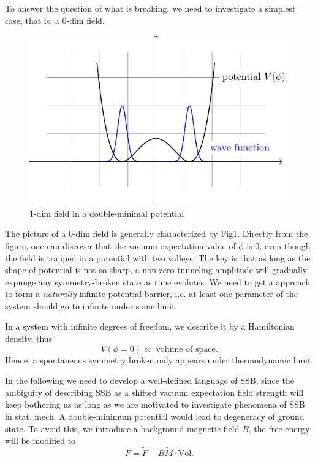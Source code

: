 To answer the question of what is breaking, we need to investigate a simplest case, that is, a $0$-dim field. 
\begin{figure}[hp]
    \centering
    \includegraphics{figures/double_minimum_potential.pdf}
    \caption{$1$-dim field in a double-minimal potential}
    \label{1d_double_minimal}
\end{figure}
The picture of a $0$-dim field is generally characterized by Fig\ref{1d_double_minimal}. Directly from the figure, one can discover that the vacuum expectation value of $\phi$ is $0$, even though the field is trapped in a potential with two valleys. The key is that as long as the shape of potential is not so sharp, a non-zero tunneling amplitude will gradually expunge any symmetry-broken state as time evolutes. We need to get a approach to form a \emph{naturally} infinite potential barrier, i.e. at least one parameter of the system should go to infinite under some limit.

In a system with infinite degrees of freedom, we describe it by a Hamiltonian density, thus
\begin{equation}
    V\left( \phi=0 \right) \propto \text{ volume of space}.
\end{equation}
Hence, a spontaneous symmetry broken only appears under thermodynamic limit.

In the following we need to develop a well-defined language of SSB, since the ambiguity of describing SSB as a shifted vacuum expectation field strength will keep bothering us as long as we are motivated to investigate phenomena of SSB in stat. mech.
A double-minimum potential would lead to degeneracy of ground state. To avoid this, we introduce a background magnetic field $B$, the free energy will be modified to
\begin{equation}
  F = \tilde{F} - B \tilde{M} \cdot \text{Vol}.
\end{equation}